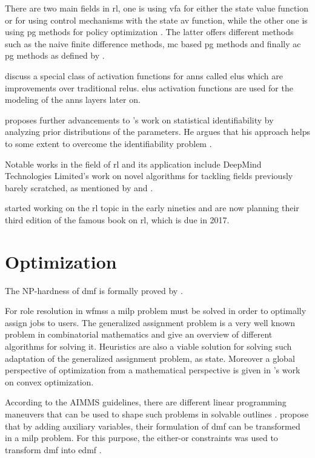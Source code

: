 There are two main fields in \gls{rl}, one is using \gls{vfa} for either the state value function or for using control mechanisms with the state \gls{av} function, while the other one is using \gls{pg} methods for policy optimization \citep{Sutton2017}. The latter offers different methods such as the naive finite difference methods, \gls{mc} based \gls{pg} methods and finally \gls{ac} \gls{pg} methods as defined by \citet{Silver2014}.

\citet{Clevert2015} discuss a special class of activation functions for \glspl{ann} called \glspl{elu} which are improvements over traditional \glspl{relu}. \glspl{elu} activation functions are used for the modeling of the \glspl{ann} layers later on.

\citet{Gershman2016} proposes further advancements to \citet{Zhang2011}'s work on statistical identifiability by analyzing prior distributions of the parameters. He argues that his approach helps to some extent to overcome the identifiability problem \citep{Gershman2016}.

Notable works in the field of \gls{rl} and its application include DeepMind Technologies Limited's work on novel algorithms for tackling fields previously barely scratched, as mentioned by \citet{Mnih2015} and \citet{Silver2016}.

\citet{Sutton2017} started working on the \gls{rl} topic in the early nineties and are now planning their third edition of the famous book on \gls{rl}, which is due in 2017.

\section{Optimization}
\label{sec:optimization}

The NP-hardness of \gls{dmf} is formally proved by \citet{Garey1990}.

For role resolution in \glspl{wfms} a \gls{milp} problem must be solved in order to optimally assign jobs to users. The generalized assignment problem is a very well known problem in combinatorial mathematics and \citet{Cattrysse1992} give an overview of different algorithms for solving it. Heuristics are also a viable solution for solving such adaptation of the generalized assignment problem, as \citet{Racer1994} state. Moreover a global perspective of optimization from a mathematical perspective is given in \citet{Boyd2004}'s work on convex optimization.

According to the AIMMS guidelines, there are different linear programming maneuvers that can be used to shape such problems in solvable outlines \citep{Bisschop2016}. \citet{Zeng2005} propose that by adding auxiliary variables, their formulation of \gls{dmf} can be transformed in a \gls{milp} problem. For this purpose, the either-or constraints was used to transform \gls{dmf} into \gls{edmf} \citep[p. 77]{Bisschop2016}.

